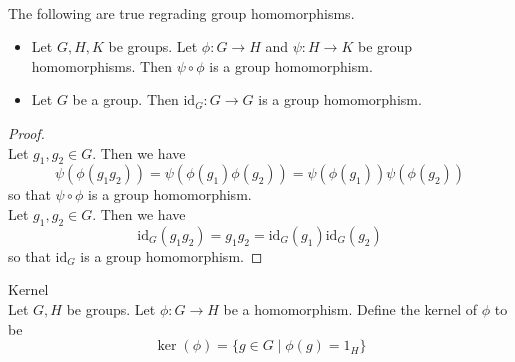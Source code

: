 \documentclass[a4paper]{article}
\begin{document}
\begin{lmm}{}{}\\
The following are true regrading group homomorphisms. 
\begin{itemize}
\item Let $G,H,K$ be groups. Let $\phi:G\to H$ and $\psi:H\to K$ be group homomorphisms. Then $\psi\circ\phi$ is a group homomorphism. 
\item Let $G$ be a group. Then $\text{id}_G:G\to G$ is a group homomorphism. 
\end{itemize}
\begin{proof}\\
Let $g_1,g_2\in G$. Then we have $$\psi(\phi(g_1g_2))=\psi(\phi(g_1)\phi(g_2))=\psi(\phi(g_1))\psi(\phi(g_2))$$ so that $\psi\circ\phi$ is a group homomorphism. \\

Let $g_1,g_2\in G$. Then we have $$\text{id}_G(g_1g_2)=g_1g_2=\text{id}_G(g_1)\text{id}_G(g_2)$$ so that $\text{id}_G$ is a group homomorphism. 
\end{proof}
\end{lmm}

\begin{defn}{Kernel}{}\\
Let $G,H$ be groups. Let $\phi:G\to H$ be a homomorphism. Define the kernel of $\phi$ to be $$\ker(\phi)=\{g\in G\;|\;\phi(g)=1_H\}$$
\end{defn}
\end{document}
